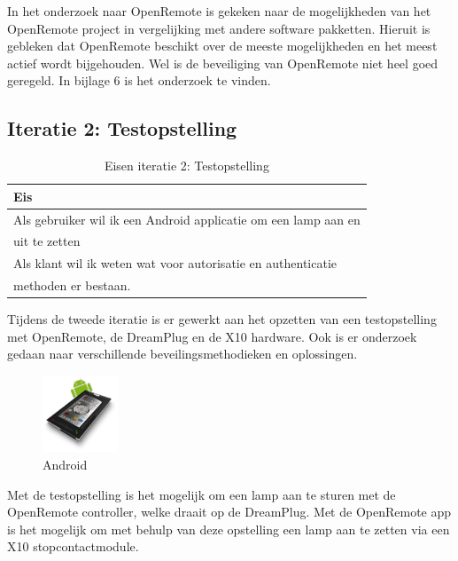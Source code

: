 \documentclass[]{article}
\begin{document}
In het onderzoek naar OpenRemote is gekeken naar de mogelijkheden van het
OpenRemote project in vergelijking met andere software pakketten. Hieruit is 
gebleken dat OpenRemote beschikt over de meeste mogelijkheden en het meest
actief wordt bijgehouden. Wel is de beveiliging van OpenRemote niet heel
goed geregeld. In bijlage 6 is het onderzoek te vinden.

\subsection{Iteratie 2: Testopstelling}
\begin{table}[htpb]
  \caption{Eisen iteratie 2: Testopstelling}
  \begin{center}
    \begin{tabular}{|| l ||}\hline
        Eis                                                              \\\hline\hline
        Als gebruiker wil ik een Android applicatie om een lamp aan en   \\ 
        uit te zetten                                                    \\\hline
        Als klant wil ik weten wat voor autorisatie en authenticatie    \\
        methoden er bestaan.                                             \\\hline
    \end{tabular}
  \end{center}
\end{table}

Tijdens de tweede iteratie is er gewerkt aan het opzetten van een
testopstelling met OpenRemote, de DreamPlug en de X10 hardware. Ook is er
onderzoek gedaan naar verschillende beveilingsmethodieken en oplossingen.

\begin{figure}
  \begin{center}
    \includegraphics[width=0.20\textwidth]{android.pdf}
  \end{center}
  \caption{Android}
\end{figure}

Met de testopstelling is het mogelijk om een lamp
aan te sturen met de OpenRemote controller, welke draait op de
DreamPlug. Met de OpenRemote app is het mogelijk om met behulp van deze
opstelling een lamp aan te zetten via een X10 stopcontactmodule.
\end{document}
